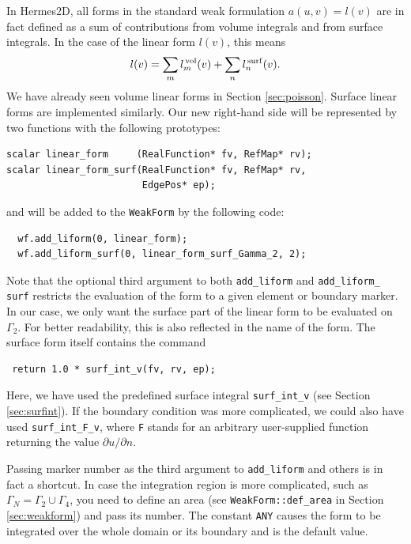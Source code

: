 In Hermes2D, all forms in the standard weak formulation $a(u,v) = l(v)$
are in fact defined as a sum of contributions from volume integrals and from
surface integrals. In the case of the linear form $l(v)$, this means
$$l(v) = \sum_m l_m^{\,\rm vol}(v) + \sum_n l_n^{\,\rm surf}(v).$$
We have already seen volume linear forms in Section \ref{sec:poisson}.
Surface linear forms are implemented similarly. Our new right-hand side will
be represented by two functions with the following prototypes:

\begin{lstlisting}
scalar linear_form     (RealFunction* fv, RefMap* rv);
scalar linear_form_surf(RealFunction* fv, RefMap* rv,
                        EdgePos* ep);
\end{lstlisting}

and will be added to the {\tt WeakForm} by the following code:

\begin{lstlisting}
  wf.add_liform(0, linear_form);
  wf.add_liform_surf(0, linear_form_surf_Gamma_2, 2);
\end{lstlisting}

Note that the optional third argument to both {\tt add\_liform} and {\tt add\_liform\_ surf}
restricts the evaluation of the form to a given element or boundary marker. In our
case, we only want the surface part of the linear form to be evaluated on $\Gamma_2$.
For better readability, this is also reflected in the name of the form. The surface
form itself contains the command

\begin{lstlisting}
 return 1.0 * surf_int_v(fv, rv, ep);
\end{lstlisting}

Here, we have used the predefined surface integral \verb"surf_int_v" (see Section
\ref{sec:surfint}). If the boundary condition was more complicated, we could also
have used \verb"surf_int_F_v", where {\tt F} stands for an arbitrary user-supplied
function returning the value $\partial u/\partial n$.

Passing marker number as the third argument to {\tt add\_liform} and others is 
in fact a shortcut. In case the integration region is more complicated, such as
$\Gamma_N = \Gamma_2 \cup \Gamma_4$, you need to define an area
(see {\tt WeakForm::def\_area} in Section \ref{sec:weakform}) and pass its number.
The constant {\tt ANY} causes the form to be integrated over the whole domain 
or its boundary and is the default value.

